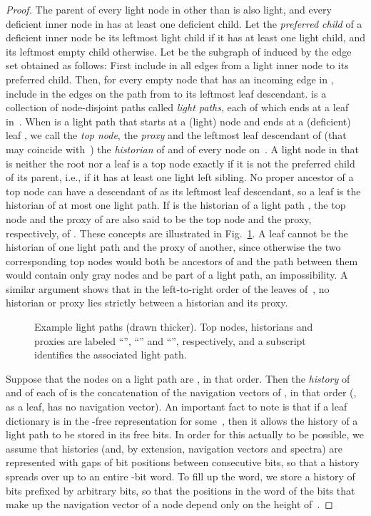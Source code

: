 \documentclass[envcountsame,envcountsect,undated,nolinenumbers]{lnthi}
\begin{document}
\begin{proof}
The parent of every light node in  other than 
is also light, and
every deficient inner node in  has at least
one deficient child.
Let the \emph{preferred child} of a deficient
inner node be its leftmost light child if
it has at least one light child, and its leftmost
empty child otherwise.
Let  be the subgraph of  induced
by the edge set  obtained as follows:
First include in  all edges
from a light inner node to its preferred child.
Then, for every empty node 
that has an incoming edge in ,
include in  the edges on the path
from  to its leftmost leaf descendant.
 is a collection of node-disjoint paths
called \emph{light paths}, each of which ends
at a leaf in~.
When  is a light path that starts at a (light) node
 and ends at a (deficient) leaf , we call  the
\emph{top node},  the \emph{proxy}
and the leftmost leaf descendant of 
(that may coincide with~)
the \emph{historian} of  and of every node on~.
A light node in  that is neither the root nor a leaf
is a top node exactly if it is not the preferred child
of its parent, i.e., if it has at least one
light left sibling.
No proper ancestor of a top node  can have
a descendant of  as its leftmost leaf descendant,
so a leaf is the historian of at
most one light path.
If  is the historian of a light path , the
top node and the proxy of  are also said to be the
top node and the proxy, respectively, of .
These concepts are illustrated in Fig.~\ref{fig:lightpaths}.
A leaf  cannot be the historian
of one light path and the proxy of another,
since otherwise the two corresponding
top nodes would both be ancestors of 
and the path between them would contain
only gray nodes and be
part of a light path, an impossibility.
A similar argument shows that in the
left-to-right order of the leaves of~,
no historian or proxy lies
strictly between a historian and its proxy.

\begin{figure}
\begin{center}
\end{center}
\caption{Example light paths (drawn thicker).
Top nodes, historians and proxies are labeled
``'', ``'' and ``'', respectively,
and a subscript identifies the associated
light path.}
\label{fig:lightpaths}
\end{figure}

Suppose that the nodes on a light path 
are , in that order.
Then the \emph{history} of
 and of each of 
is the concatenation of the
navigation vectors of ,
in that order (, as a leaf, has
no navigation vector).
An important fact to note is that if
a leaf dictionary
is in the -free representation for some~,
then it allows the history of a light path to be stored
in its  free bits.
In order for this actually to be possible, we assume
that histories (and, by extension,
navigation vectors and spectra) are represented with 
gaps of  bit positions between consecutive bits,
so that a history spreads over up to an entire
-bit word.
To fill up the word,
we store a history of  bits
prefixed by  arbitrary bits,
so that the positions in the word of the bits that make up
the navigation vector of a node 
depend only on the height of~.


\end{proof}
\end{document}

